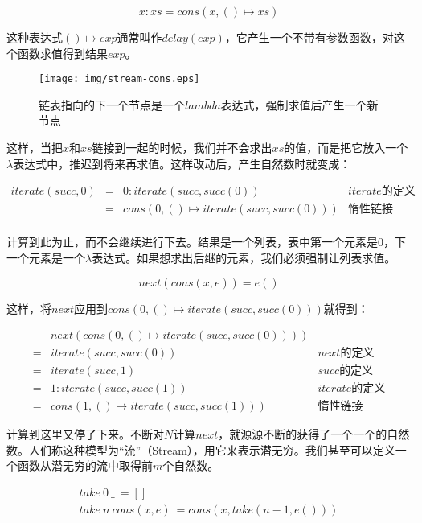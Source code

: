\documentclass{article}
\begin{document}
\[
x : xs = cons(x, () \mapsto xs)
\]

这种表达式$() \mapsto exp$通常叫作$delay(exp)$，它产生一个不带有参数函数，对这个函数求值得到结果$exp$。

\begin{figure}[htbp]
 \centering
 \texttt{[image: img/stream-cons.eps]}
 \caption{链表指向的下一个节点是一个$lambda$表达式，强制求值后产生一个新节点}
 \label{fig:stream-cons}
\end{figure}

这样，当把$x$和$xs$链接到一起的时候，我们并不会求出$xs$的值，而是把它放入一个$\lambda$表达式中，推迟到将来再求值。这样改动后，产生自然数时就变成：

\[
\begin{array}{rcll}
iterate(succ, 0) & = & 0 : iterate(succ, succ(0)) & iterate\text{的定义}\\
                 & = & cons(0, () \mapsto iterate(succ, succ(0))) & \text{惰性链接} \\
\end{array}
\]

计算到此为止，而不会继续进行下去。结果是一个列表，表中第一个元素是0，下一个元素是一个$\lambda$表达式。如果想求出后继的元素，我们必须强制让列表求值。

\[
next(cons(x, e)) = e()
\]

这样，将$next$应用到$cons(0, () \mapsto iterate(succ, succ(0)))$就得到：

\[
\begin{array}{cll}
  & next(cons(0, () \mapsto iterate(succ, succ(0)))) & \\
= & iterate(succ, succ(0)) & next\text{的定义} \\
= & iterate(succ, 1) & succ\text{的定义} \\
= & 1 : iterate(succ, succ(1)) & iterate\text{的定义} \\
= & cons(1, () \mapsto iterate(succ, succ(1))) & \text{惰性链接}
\end{array}
\]

计算到这里又停了下来。不断对$N$计算$next$，就源源不断的获得了一个一个的自然数。人们称这种模型为“流”（Stream），用它来表示潜无穷。我们甚至可以定义一个函数从潜无穷的流中取得前$m$个自然数。

\[
\begin{array}{l}
take\ 0\ \_\ = [] \\
take\ n\ cons(x, e)\ = cons(x, take(n-1, e())) \\
\end{array}
\]
\end{document}
